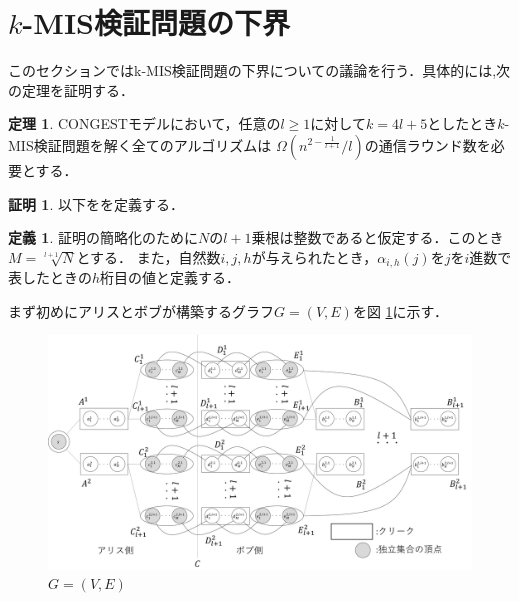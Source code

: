 \documentclass[12pt]{thesis}
\newcommand{\CONGEST}{\textsf{CONGEST}}
\theoremstyle{definition}
\newtheorem{theorem}{定理}[chapter]
\newtheorem{definition}{定義}[chapter]
\newtheorem*{prf*}{証明}
\begin{document}
\section{$k$-MIS検証問題の下界}
このセクションではk-MIS検証問題の下界についての議論を行う．具体的には,次の定理を証明する．
\begin{theorem}
{\CONGEST}モデルにおいて，任意の$l \geq 1$に対して$k = 4l + 5$としたとき$k$-MIS検証問題を解く全てのアルゴリズムは
$\Omega\left(n^{2 - \frac{1}{l+1}}/l\right)$の通信ラウンド数を必要とする．
\end{theorem}

\begin{prf*}
以下をを定義する．
\begin{definition}
証明の簡略化のために$N$の$l + 1$乗根は整数であると仮定する．このとき$M = \sqrt[l + 1]{N}$とする．
また，自然数$i, j, h$が与えられたとき，$\alpha_{i, h}(j)$を$j$を$i$進数で表したときの$h$桁目の値と定義する．
\end{definition}
まず初めにアリスとボブが構築するグラフ$G = (V, E)$を図 \ref{k_G}に示す．

\begin{figure}[ht]
\begin{center}
\includegraphics[width=120mm]{k_G.png}
\end{center}
\caption{$G = (V, E)$}
\label{k_G}
\end{figure}


\end{prf*}
\end{document}
